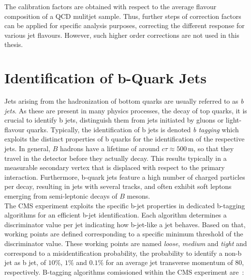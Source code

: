 The calibration factors are obtained with respect to the average flavour composition of a QCD mulitjet sample. Thus, further steps of correction factors can be applied for specific analysis purposes, \eg correcting the different response for various jet flavours. However, such higher order corrections are not used in this thesis.  

\section{Identification of b-Quark Jets}
\label{sec:btagging}
Jets arising from the hadronization of bottom quarks are usually referred to as \textit{b jets}. As these are present in many physics processes, \eg the decay of top quarks, it is crucial to identify b jets, \ie distinguish them from jets initiated by gluons or light-flavour quarks. Typically, the identification of b jets is denoted \textit{b tagging} which exploits the distinct properties of b quarks for the identification of the respective jets. In general, $B$ hadrons have a lifetime of around $c\tau \approx 500$\,\textmu m, so that they travel in the detector before they actually decay. This results typically in a measurable secondary vertex that is displaced with respect to the primary interaction. Furthermore, b-quark jets feature a high number of charged particles per decay, resulting in jets with several tracks, and often exhibit soft leptons emerging from semi-leptonic decays of $B$ mesons. \\
The CMS experiment exploits the specific b-jet properties in dedicated b-tagging algorithms for an efficient b-jet identification. Each algorithm determines a discriminator value per jet indicating how b-jet-like a jet behaves. Based on that, working points are defined corresponding to a specific minimum threshold of the discriminator value. These working points are named \textit{loose}, \textit{medium} and \textit{tight} and correspond to a misidentification probability, \ie the probability to identify a non-b jet as b jet, of $10\%$, $1\%$ and $0.1\%$ for an average jet transverse momentum of $80$\gev, respectively. B-tagging algorithms comissioned within the CMS experiment are~\cite{Chatrchyan:2012jua}:
